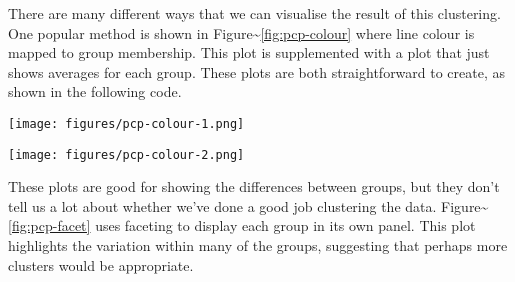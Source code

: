\begin{Shaded}
\begin{Highlighting}[]
\StringTok{ }\NormalTok{(ratings[}\NormalTok{:}\NormalTok{], }\NormalTok{)}
\StringTok{ }\NormalTok{(}
\StringTok{ }\NormalTok{(}
\StringTok{ }
\end{Highlighting}
\end{Shaded}

There are many different ways that we can visualise the result of this
clustering. One popular method is shown in
Figure\textasciitilde{}\ref{fig:pcp-colour} where line colour is mapped
to group membership. This plot is supplemented with a plot that just
shows averages for each group. These plots are both straightforward to
create, as shown in the following code.

\begin{Shaded}
\begin{Highlighting}[]
\StringTok{ }
    
\StringTok{ }\NormalTok{(}  \NormalTok{/}\NormalTok{)}
\end{Highlighting}
\end{Shaded}

\texttt{[image: figures/pcp-colour-1.png]}

\begin{Shaded}
\begin{Highlighting}[]
\StringTok{ }\NormalTok{(}\NormalTok{(}  
   \NormalTok{)}
\end{Highlighting}
\end{Shaded}

\texttt{[image: figures/pcp-colour-2.png]}

These plots are good for showing the differences between groups, but
they don't tell us a lot about whether we've done a good job clustering
the data. Figure\textasciitilde{}\ref{fig:pcp-facet} uses faceting to
display each group in its own panel. This plot highlights the variation
within many of the groups, suggesting that perhaps more clusters would
be appropriate.

